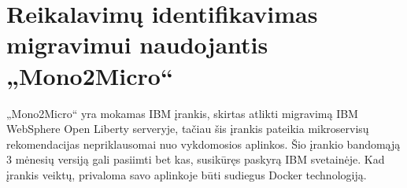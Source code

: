 \documentclass{VUMIFPSbakalaurinis}
\begin{document}

\section{Reikalavimų identifikavimas migravimui naudojantis „Mono2Micro“}
„Mono2Micro“ yra mokamas IBM įrankis, skirtas atlikti migravimą IBM WebSphere Open Liberty serveryje, tačiau šis įrankis pateikia mikroservisų rekomendacijas nepriklausomai nuo vykdomosios aplinkos. Šio įrankio bandomąją 3 mėnesių versiją gali pasiimti bet kas, susikūręs paskyrą IBM svetainėje. Kad įrankis veiktų, privaloma savo aplinkoje būti sudiegus Docker technologiją. 
\end{document}
